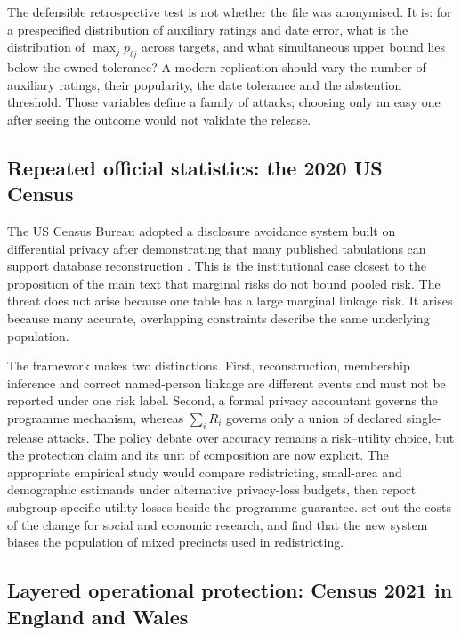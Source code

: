 \documentclass[11pt,a4paper]{article}
\theoremstyle{plain}
\theoremstyle{definition}
\begin{document}
The defensible retrospective test is not whether the file was anonymised. It is:
for a prespecified distribution of auxiliary ratings and date error, what is the
distribution of $\max_j p_{tj}$ across targets, and what simultaneous upper bound
lies below the owned tolerance? A modern replication should vary the number of
auxiliary ratings, their popularity, the date tolerance and the abstention
threshold. Those variables define a family of attacks; choosing only an easy one
after seeing the outcome would not validate the release.

\subsection{Repeated official statistics: the 2020 US Census}

The US Census Bureau adopted a disclosure avoidance system built on differential
privacy \citep{abowd2018} after demonstrating that many published tabulations can support database
reconstruction \citep{garfinkel2019,abowd2022,abowd2023}. This is the
institutional case closest to the proposition of the main text that marginal risks do not bound pooled risk. The threat does not
arise because one table has a large marginal linkage risk. It arises because many
accurate, overlapping constraints describe the same underlying population.

The framework makes two distinctions. First, reconstruction, membership inference
and correct named-person linkage are different events and must not be reported
under one risk label. Second, a formal privacy accountant governs the programme
mechanism, whereas $\sum_i R_i$ governs only a union of declared single-release
attacks. The policy debate over accuracy remains a risk--utility choice, but the
protection claim and its unit of composition are now explicit. The appropriate
empirical study would compare redistricting, small-area and demographic estimands
under alternative privacy-loss budgets, then report subgroup-specific utility
losses beside the programme guarantee. \citet{ruggles2019} set out the costs of
the change for social and economic research, and \citet{kenny2021} find that the
new system biases the population of mixed precincts used in redistricting.

\subsection{Layered operational protection: Census 2021 in England and Wales}
\end{document}
